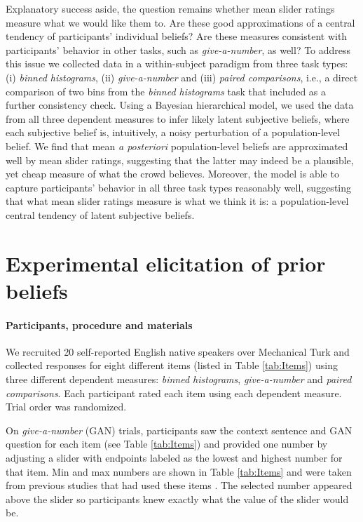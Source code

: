 \documentclass[10pt,letterpaper]{article}
\newcommand{\tableref}[1]{Table \ref{#1}}
\begin{document}
Explanatory success aside, the question remains whether mean slider ratings measure what we
would like them to. Are these good approximations of a central tendency of participants'
individual beliefs? Are these measures consistent with participants' behavior in other tasks,
such as \emph{give-a-number}, as well? To address this issue we collected data in a
within-subject paradigm from three task types: (i) \emph{binned histograms}, (ii)
\emph{give-a-number} and (iii) \emph{paired comparisons}, i.e., a direct comparison of two bins
from the \emph{binned histograms} task that included as a further consistency check. Using a
Bayesian hierarchical model, we used the data from all three dependent measures to infer likely
latent subjective beliefs, where each subjective belief is, intuitively, a noisy perturbation
of a population-level belief. We find that mean \emph{a posteriori} population-level beliefs
are approximated well by mean slider ratings, suggesting that the latter may indeed be a
plausible, yet cheap measure of what the crowd believes.  Moreover, the model is able to
capture participants' behavior in all three task types reasonably well, suggesting that what
mean slider ratings measure is what we think it is: a population-level central tendency of
latent subjective beliefs.

\section{Experimental elicitation of prior beliefs}

\paragraph{Participants, procedure and materials} We recruited 20 self-reported English native
speakers over Mechanical Turk and collected responses for eight different items (listed in
\tableref{tab:Items}) using three different dependent measures: \emph{binned histograms},
\emph{give-a-number} and \emph{paired comparisons}. Each participant rated each item using each
dependent measure. Trial order was randomized.



On \emph{give-a-number} (GAN) trials, participants saw the context sentence and GAN question
for each item (see \tableref{tab:Items}) and provided one number by adjusting a
slider with endpoints labeled as the lowest and highest number for that item. Min and max
numbers are shown in \tableref{tab:Items} and were taken from previous studies that had used
these items
\cite{DegenTessler2015:Wonky-worlds:-L,SchollerFranke2015:Semantic-values,KaoWu2014:Nonliteral-Unde}. The
selected number appeared above the slider so participants knew exactly what the value of the
slider would be.
\end{document}
